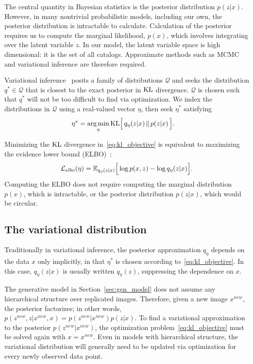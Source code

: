 The central quantity in Bayesian statistics is the posterior distribution $p(z|x)$.
However, in many
nontrivial probabilistic models, including our own, the posterior distribution is intractable to calculate.
Calculation of the posterior requires us to compute the marginal likelihood, $p(x)$, which involves integrating over the latent variable $z$. 
In our model, the latent variable space is high dimensional: it is the set of all catalogs. Approximate methods such as MCMC and variational inference are therefore required. 

Variational inference~\citep{Jordan_intro_vi, Wainwrite_graph_models_vi, Blei_2017_vi_review} posits a family of distributions $\mathcal{Q}$ and seeks
the distribution $q^*\in \mathcal{Q}$ that is closest to the exact posterior
in $\textrm{KL}$ divergence. 
$\mathcal{Q}$ is chosen such that $q^*$ will not be too difficult to find via optimization. 
We index the distributions in $\mathcal{Q}$ using a real-valued vector $\eta$, then seek $\eta^*$ satisfying
\begin{align}
   \eta^* &= \operatorname*{arg\,min}_{\eta} \mathrm{KL}\Big[\,q_\eta(z | x)\, \| \,p(z | x)\,\Big].
   \label{eq:kl_objective}
\end{align}

Minimizing the $\textrm{KL}$ divergence in~\eqref{eq:kl_objective} is equivalent to maximizing the evidence lower bound (ELBO)~\citep{Blei_2017_vi_review}:
\begin{align}
    \mathcal{L}_{elbo}(\eta) = 
    \mathbb{E}_{q_\eta(z | x)}\Big[\log p(x, z) - \log q_\eta(z | x)\Big].
    \label{eq:elbo}
\end{align}
Computing the ELBO does not require computing the marginal distribution $p(x)$, which is intractable, or the posterior distribution $p(z | x)$, which would be circular. 

\subsection{The variational distribution}
\label{sec:var_distr}
Traditionally in variational inference, the posterior approximation $q_\eta$ depends on the data $x$ only implicitly, 
in that $\eta^*$ is chosen according to~\eqref{eq:kl_objective}.
In this case, $q_\eta(z | x)$ is usually written $q_\eta(z)$, suppressing the dependence on $x$.

The generative model in Section~\ref{sec:gen_model} does not assume any hierarchical structure over replicated  images. Therefore, given a new image $x^{new}$, the posterior factorizes; in other words,
$p(z^{new}, z | x^{new}, x) = p(z^{new} | x^{new}) p(z | x)$. 
To find a variational  approximation to the posterior $p(z^{new} | x^{new})$, the optimization problem~\eqref{eq:kl_objective} must be solved again with $x = x^{new}$.
Even in models with hierarchical structure, the variational distribution will generally need to be updated via optimization for every newly observed data point. 

